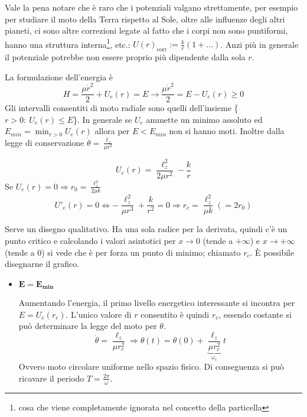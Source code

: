 \documentclass[Main.tex]{subfiles}
\begin{document}
\newpage
\begin{tema} \label{Ukepleriano}
	Vale la pena notare che è raro che i potenziali valgano strettamente, per esempio per studiare il moto della Terra rispetto al Sole, oltre alle influenze degli altri pianeti, ci sono altre correzioni legate al fatto che i corpi non sono puntiformi, hanno una struttura interna\footnote{cosa che viene completamente ignorata nel concetto della particella}, etc.: $U(r)_{\text{corr}}:= \frac{k}{r} (1+...)$. Anzi più in generale il potenziale potrebbe non essere proprio più dipendente dalla sola $r$.

	La formulazione dell'energia è
	\begin{equation}
	H= \frac{\mu \dot r^2}{2} + U_e(r) =E \longrightarrow \frac{\mu \dot r^2}{2}=E-U_e(r) \geq 0
\end{equation}
Gli intervalli consentiti di moto radiale sono quelli dell'insieme \{$r>0: \ U_e(r) \leq E$\}. In generale se $U_e$ ammette un minimo assoluto ed $E_{min}=\min_{r>0} U_e(r)$ allora per $E<E_{min}$ non si hanno moti.
Inoltre dalla legge di conservazione $\dot \theta = \frac{\ell_z}{\mu r^2}$

\begin{equation}
	U_e(r) = \frac{\ell_z^2}{2 \mu r^2} - \frac{k}{r}
\end{equation}
Se $U_e(r)=0 \Rightarrow r_0 = \frac{\ell_z^2}{2 \mu k}$
\begin{equation}
	U'_e(r) =0 \iff - \frac{\ell_z^2}{\mu r^3} + \frac{k}{r^2} =0 \Rightarrow r_c = \frac{\ell_z^2}{\mu k} (= 2 r_0)
\end{equation}

Serve un disegno qualitativo. Ha una sola radice per la derivata, quindi c'è un punto critico e calcolando i valori asintotici per $x \rightarrow 0$ (tende a $+\infty$) e $x \rightarrow + \infty$ (tende a 0) si vede che è per forza un punto di minimo; chiamato $r_c$. È possibile disegnarne il grafico.
 

\begin{itemize}
	\item $\mathbf{E=E_{min}}$ 
	
	Aumentando l'energia, il primo livello energetico interessante si incontra per $E=U_e( r_c)$.  L'unico valore di $r$ consentito è quindi $r_c$, essendo costante si può determinare la legge del moto per $\theta$.
\begin{equation}
	\dot \theta = \frac{\ell_z}{\mu r_c^2} \Longrightarrow \boxed{\theta (t) = \theta (0) + \underbrace{ \frac{\ell_z}{\mu r_c^2}}_{\omega_c} t}
\end{equation}
Ovvero moto circolare uniforme nello spazio fisico. Di conseguenza si può ricavare il periodo $T=\frac{ 2\pi}{\omega}$. \bigskip



\end{itemize}
\end{tema}
\end{document}
